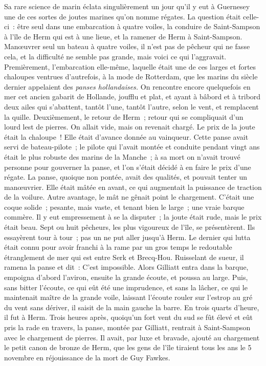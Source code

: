 \documentclass[french,twoside]{book} %
\begin{document}
 Sa rare science de marin éclata singulièrement un jour qu’il y eut à Guernesey une de ces sortes de joutes marines qu’on nomme régates. La question était celle-ci : être seul dans une embarcation à quatre voiles, la conduire de Saint-Sampson à l’île de Herm qui est à une lieue, et la ramener de Herm à Saint-Sampson. Manœuvrer seul un bateau à quatre voiles, il n’est pas de pêcheur qui ne fasse cela, et la difficulté ne semble pas grande, mais voici ce qui l’aggravait. Premièrement, l’embarcation elle-même, laquelle était une de ces larges et fortes chaloupes ventrues d’autrefois, à la mode de Rotterdam, que les marins du siècle dernier appelaient des \emph{panses hollandaises.} On rencontre encore quelquefois en mer cet ancien gabarit de Hollande, joufflu et plat, et ayant à bâbord et à tribord deux ailes qui s’abattent, tantôt l’une, tantôt l’autre, selon le vent, et remplacent la quille. Deuxièmement, le retour de Herm ; retour qui se compliquait d’un lourd lest de pierres. On allait vide, mais on revenait chargé. Le prix de la joute était la chaloupe ! Elle était d’avance donnée au vainqueur. Cette panse avait servi de bateau-pilote ; le pilote qui l’avait montée et conduite pendant vingt ans était le plus robuste des marins de la Manche ; à sa mort on n’avait trouvé personne pour gouverner la panse, et l’on s’était décidé à en faire le prix d’une régate. La panse, quoique non pontée, avait des qualités, et pouvait tenter un manœuvrier. Elle était mâtée en avant, ce qui augmentait la puissance de traction de la voilure. Autre avantage, le mât ne gênait point le chargement. C’était une coque  solide ; pesante, mais vaste, et tenant bien le large ; une vraie barque commère. Il y eut empressement à se la disputer ; la joute était rude, mais le prix était beau. Sept ou huit pêcheurs, les plus vigoureux de l’île, se présentèrent. Ils essayèrent tour à tour ; pas un ne put aller jusqu’à Herm. Le dernier qui lutta était connu pour avoir franchi à la rame par un gros temps le redoutable étranglement de mer qui est entre Serk et Brecq-Hou. Ruisselant de sueur, il ramena la panse et dit : C’est impossible. Alors Gilliatt entra dans la barque, empoigna d’abord l’aviron, ensuite la grande écoute, et poussa au large. Puis, sans bitter l’écoute, ce qui eût été une imprudence, et sans la lâcher, ce qui le maintenait maître de la grande voile, laissant l’écoute rouler sur l’estrop au gré du vent sans dériver, il saisit de la main gauche la barre. En trois quarts d’heure, il fut à Herm. Trois heures après, quoiqu’un fort vent du sud se fût élevé et eût pris la rade en travers, la panse, montée par Gilliatt, rentrait à Saint-Sampson avec le chargement de pierres. Il avait, par luxe et bravade, ajouté au chargement le petit canon de bronze de Herm, que les gens de l’île tiraient tous les ans le 5 novembre en réjouissance de la mort de Guy Fawkes.\par
\end{document}
